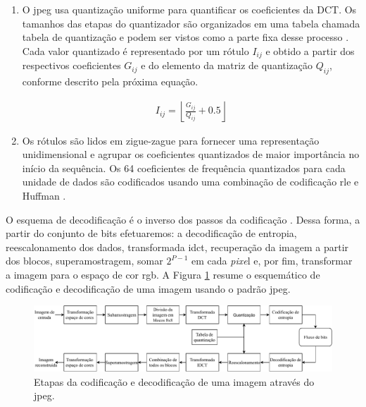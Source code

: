 \begin{enumerate}
	\item O \acrshort{jpeg} usa quantização uniforme para quantificar os coeficientes da DCT. Os tamanhos das etapas do quantizador são organizados em uma tabela chamada tabela de quantização e podem ser vistos como a parte fixa desse processo \cite{sayood2017introduction}. 
	Cada valor quantizado é representado por um rótulo $I_{ij}$ e obtido a partir dos respectivos coeficientes $G_{ij}$ e do elemento da matriz de quantização $Q_{ij}$, conforme descrito pela próxima equação. 
	
	\begin{equation}
	\begin{aligned}
	I_{ij} = \left \lfloor \frac{G_{ij}}{Q_{ij}} +0.5  \right \rfloor 
	\end{aligned}
	\end{equation}
	
	\item Os rótulos são lidos em zigue-zague para fornecer uma representação unidimensional e agrupar os coeficientes quantizados de maior importância no início da sequência. 
	Os 64 coeficientes de frequência quantizados para cada unidade de dados são codificados usando uma combinação de codificação \gls{rle} e Huffman \cite{salomon2007data}. 
	
\end{enumerate}  
O esquema de decodificação é o inverso dos passos da codificação \cite{sayood2017introduction}. Dessa forma, a partir do conjunto de bits efetuaremos: a decodificação de entropia, reescalonamento dos dados, transformada \acrshort{idct}, recuperação da imagem a partir dos blocos, superamostragem, somar $2^{P-1}$ em cada \textit{pixe}l e, por fim, transformar a imagem para o espaço de cor \acrshort{rgb}. A Figura \ref{fig:jpeg} resume o esquemático de codificação e decodificação de uma imagem usando o padrão \acrshort{jpeg}.


\begin{figure}[h]
	\centering
	\includegraphics[width=1.0\textwidth]{figuras/jpeg.pdf}
	\caption[Padrão \acrshort{jpeg}]{Etapas da codificação e decodificação de uma imagem através do \acrshort{jpeg}.}
	\label{fig:jpeg}
\end{figure}


